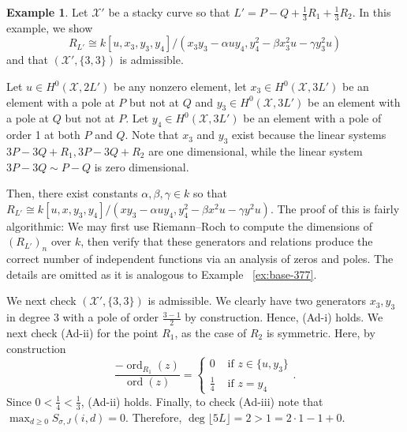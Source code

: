 \documentclass{amsart}
\theoremstyle{plain}
\theoremstyle{definition}
\newtheorem{example}[thm]{Example}
\theoremstyle{remark}
\numberwithin{equation}{section}
\newcommand \sx{\mathscr X}
\DeclareMathOperator{\ord}{ord}
\newcommand \halfcan{L}
\begin{document}
\begin{example}
\label{eg:base-1-33}
Let $\sx'$ be a stacky curve so that $\halfcan' = P - Q + \frac{1}{3}R_1 + \frac{1}{3}R_2$. In this example, we show
$$R_{\halfcan'} \cong k[u,x_3,y_3,y_4]/(x_3 y_3- \alpha uy_4,y_4^2 - \beta x_3^2 u - \gamma y_3^2u)$$
and that $(\sx',\{3,3\})$ is admissible.

Let $u \in H^0(\sx,2\halfcan')$ be any nonzero element, let $x_3 \in H^0(\sx,3\halfcan')$ be an element with a pole at $P$ but not at $Q$ and $y_3 \in H^0(\sx,3\halfcan')$ be an element with a pole at $Q$ but not at $P$. Let $y_4 \in H^0(\sx,3\halfcan')$ be an element with a pole of order 1 at both $P$ and $Q$. Note that $x_3$ and $y_3$ exist because the linear systems $3P - 3Q + R_1, 3P - 3Q + R_2$ are one dimensional, while the linear system $3P - 3Q \sim P-Q$ is zero dimensional.

Then, there exist constants $\alpha,\beta,\gamma \in k$ so that 
$R_{\halfcan'} \cong k[u,x,y_3,y_4]/(xy_3- \alpha uy_4,y_4^2 - \beta x^2 u - \gamma y^2u).$ The proof of this is fairly algorithmic: We may first use Riemann--Roch to compute the dimensions of $(R_{\halfcan'})_n$ over $k$, then verify that these generators and relations produce the correct number of independent functions via an analysis of zeros and poles. The details are omitted as it is analogous to Example ~\ref{ex:base-377}.

We next check $(\sx',\{3,3\})$ is admissible. We clearly have two generators $x_3,y_3$ in degree 3 with a pole of order $\frac{3-1}{2}$ by construction. Hence, (Ad-i) holds. We next check (Ad-ii) for the point $R_1$, as the case of $R_2$ is symmetric. Here, by construction
$$
\frac{-\ord_{R_1}(z)}{\ord(z)} = \begin{cases}
	0 &\text{ if }z \in \{u,y_3\}\\
	\frac{1}{4} &\text{ if }z = y_4
\end{cases}.$$
Since $0 < \frac{1}{4} < \frac{1}{3}$, (Ad-ii) holds.
Finally, to check (Ad-iii) note that $\max_{d \geq 0}S_{\sigma,J}(i,d) = 0.$ Therefore, $\deg \lfloor 5L \rfloor  = 2 > 1 = 2 \cdot 1 -1 + 0$.
\end{example}
\end{document}
